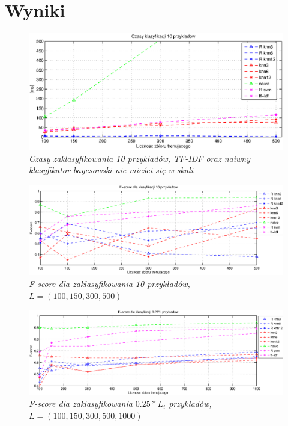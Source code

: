 \documentclass[a4paper, 10pt]{article}
\begin{document}
\section{Wyniki}

\begin{figure}[ht!]
\centering
\includegraphics[width=165mm]{wykresy/czas500.eps}
\caption{\it{Czasy zaklasyfikowania 10 przykładów, TF-IDF oraz naiwny klasyfikator bayesowski nie mieści się w skali}}
\label{overflow}
\end{figure}

\begin{figure}[ht!]
\centering
\includegraphics[width=165mm]{wykresy/score500.eps}
\caption{\it{F-score dla zaklasyfikowania 10 przykładów, $L=(100,150,300,500)$}}
\label{overflow}
\end{figure}

\begin{figure}[ht!]
\centering
\includegraphics[width=165mm]{wykresy/score1000.eps}
\caption{\it{F-score dla zaklasyfikowania $0.25*L_i$ przykładów, $L=(100,150,300,500,1000)$}}
\label{overflow}
\end{figure}
\end{document}
